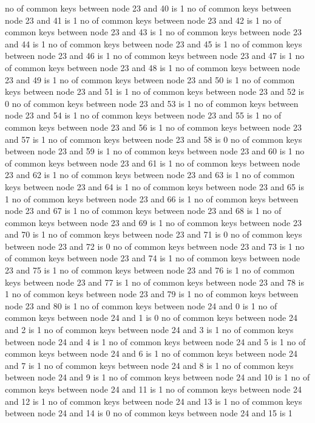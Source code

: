 no of common keys between node 23 and 40 is 1
no of common keys between node 23 and 41 is 1
no of common keys between node 23 and 42 is 1
no of common keys between node 23 and 43 is 1
no of common keys between node 23 and 44 is 1
no of common keys between node 23 and 45 is 1
no of common keys between node 23 and 46 is 1
no of common keys between node 23 and 47 is 1
no of common keys between node 23 and 48 is 1
no of common keys between node 23 and 49 is 1
no of common keys between node 23 and 50 is 1
no of common keys between node 23 and 51 is 1
no of common keys between node 23 and 52 is 0
no of common keys between node 23 and 53 is 1
no of common keys between node 23 and 54 is 1
no of common keys between node 23 and 55 is 1
no of common keys between node 23 and 56 is 1
no of common keys between node 23 and 57 is 1
no of common keys between node 23 and 58 is 0
no of common keys between node 23 and 59 is 1
no of common keys between node 23 and 60 is 1
no of common keys between node 23 and 61 is 1
no of common keys between node 23 and 62 is 1
no of common keys between node 23 and 63 is 1
no of common keys between node 23 and 64 is 1
no of common keys between node 23 and 65 is 1
no of common keys between node 23 and 66 is 1
no of common keys between node 23 and 67 is 1
no of common keys between node 23 and 68 is 1
no of common keys between node 23 and 69 is 1
no of common keys between node 23 and 70 is 1
no of common keys between node 23 and 71 is 0
no of common keys between node 23 and 72 is 0
no of common keys between node 23 and 73 is 1
no of common keys between node 23 and 74 is 1
no of common keys between node 23 and 75 is 1
no of common keys between node 23 and 76 is 1
no of common keys between node 23 and 77 is 1
no of common keys between node 23 and 78 is 1
no of common keys between node 23 and 79 is 1
no of common keys between node 23 and 80 is 1
no of common keys between node 24 and 0 is 1
no of common keys between node 24 and 1 is 0
no of common keys between node 24 and 2 is 1
no of common keys between node 24 and 3 is 1
no of common keys between node 24 and 4 is 1
no of common keys between node 24 and 5 is 1
no of common keys between node 24 and 6 is 1
no of common keys between node 24 and 7 is 1
no of common keys between node 24 and 8 is 1
no of common keys between node 24 and 9 is 1
no of common keys between node 24 and 10 is 1
no of common keys between node 24 and 11 is 1
no of common keys between node 24 and 12 is 1
no of common keys between node 24 and 13 is 1
no of common keys between node 24 and 14 is 0
no of common keys between node 24 and 15 is 1
